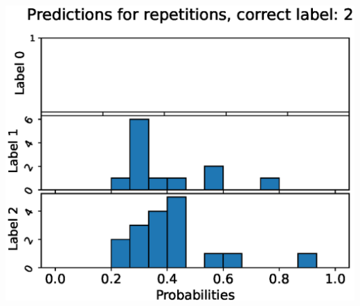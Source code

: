 \begin{center}
\begin{minipage}{0.33\textwidth}
  \includegraphics[width=\textwidth]{files/figs/app/hists/pelvis/pr2.eps}
\end{minipage}


\end{center}
